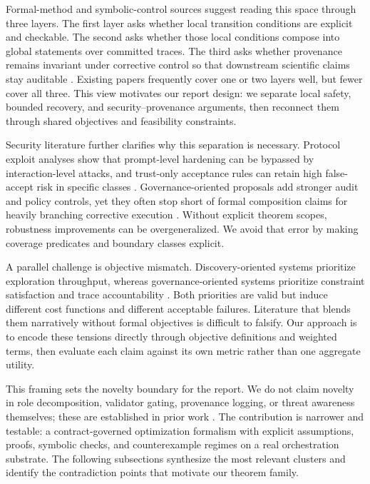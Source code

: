 \documentclass{article} %
\begin{document}
Formal-method and symbolic-control sources suggest reading this space through three layers. The first layer asks whether local transition conditions are explicit and checkable. The second asks whether those local conditions compose into global statements over committed traces. The third asks whether provenance remains invariant under corrective control so that downstream scientific claims stay auditable \citep{song2026b,sawant2026,dinu2024,glas2026}. Existing papers frequently cover one or two layers well, but fewer cover all three. This view motivates our report design: we separate local safety, bounded recovery, and security--provenance arguments, then reconnect them through shared objectives and feasibility constraints.

Security literature further clarifies why this separation is necessary. Protocol exploit analyses show that prompt-level hardening can be bypassed by interaction-level attacks, and trust-only acceptance rules can retain high false-accept risk in specific classes \citep{ferrag2026,ismail2025,gao2025,ferrag2025}. Governance-oriented proposals add stronger audit and policy controls, yet they often stop short of formal composition claims for heavily branching corrective execution \citep{glas2026,xin2025,reddy2025}. Without explicit theorem scopes, robustness improvements can be overgeneralized. We avoid that error by making coverage predicates and boundary classes explicit.

A parallel challenge is objective mismatch. Discovery-oriented systems prioritize exploration throughput, whereas governance-oriented systems prioritize constraint satisfaction and trace accountability \citep{hou2025,zhang2025,dong2025,glas2026,reddy2025}. Both priorities are valid but induce different cost functions and different acceptable failures. Literature that blends them narratively without formal objectives is difficult to falsify. Our approach is to encode these tensions directly through objective definitions and weighted terms, then evaluate each claim against its own metric rather than one aggregate utility.

This framing sets the novelty boundary for the report. We do not claim novelty in role decomposition, validator gating, provenance logging, or threat awareness themselves; these are established in prior work \citep{song2026,sawant2026,ferrag2026,glas2026}. The contribution is narrower and testable: a contract-governed optimization formalism with explicit assumptions, proofs, symbolic checks, and counterexample regimes on a real orchestration substrate. The following subsections synthesize the most relevant clusters and identify the contradiction points that motivate our theorem family.
\end{document}
